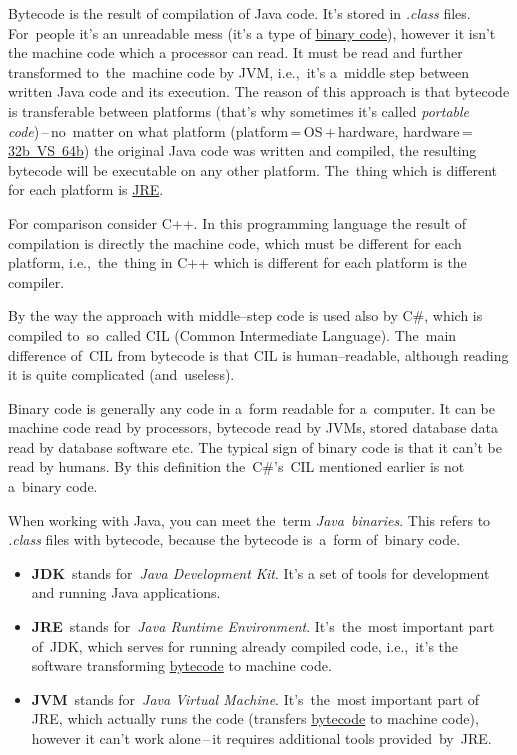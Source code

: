 \label{bytecode}
Bytecode is the result of compilation of Java code. It's stored in \textit{.class} files. For~people it's an unreadable mess (it's a type of \hyperref[bytecodebinarycode]{binary code}), however it isn't the machine code which a processor can read. It must be read and further transformed to~the~machine code by JVM, i.e.,~it's a~middle step between written Java code and its execution. The reason of this approach is that bytecode is transferable between platforms (that's why sometimes it's called \textit{portable code})\,--\,no~matter on what platform (platform\,=\,OS\,+\,hardware, hardware\,=\,\hyperref[32bvs64b]{32b~VS~64b}) the original Java code was written and compiled, the resulting bytecode will be executable on any other platform. The~thing which is different for each platform is \hyperref[jdkjrejvm]{JRE}.

For comparison consider C++. In this programming language the result of compilation is directly the machine code, which must be different for each platform, i.e.,~the~thing in C++ which is different for each platform is the compiler.

By the way the approach with middle--step code is used also by C\#, which is compiled to~so~called CIL (Common Intermediate Language). The~main difference of~CIL from bytecode is that CIL is human--readable, although reading it is quite complicated (and~useless).

\label{bytecodebinarycode}
Binary code is generally any code in a~form readable for a~computer. It can be machine code read by processors, bytecode read by JVMs, stored database data read by database software etc. The typical sign of binary code is that it can't be read by humans. By this definition the~C\#'s~CIL mentioned earlier is not a~binary code.

When working with Java, you can meet the~term \textit{Java~binaries}. This refers to \textit{.class} files with bytecode, because the bytecode is~a~form of~binary code.

\label{jdkjrejvm}
\begin{itemize}
    \item \textbf{JDK}~stands for~\textit{Java Development Kit}. It's a set of tools for development and running Java applications.
    \item \textbf{JRE}~stands for~\textit{Java Runtime Environment}. It's~the~most important part of~JDK, which serves for running already compiled code, i.e.,~it's the software transforming \hyperref[bytecode]{bytecode} to machine code.
    \item \textbf{JVM}~stands for~\textit{Java Virtual Machine}. It's~the~most important part of JRE, which actually runs the code (transfers \hyperref[bytecode]{bytecode} to machine code), however it can't work alone\,--\,it requires additional tools provided~by~JRE.
\end{itemize}

